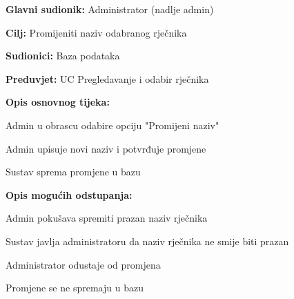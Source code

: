 \noindent {}
\begin{packed_item}

	\item \textbf{Glavni sudionik: } Administrator (nadlje admin)
	\item \textbf{Cilj: } Promijeniti naziv odabranog rječnika
	\item \textbf{Sudionici: } Baza podataka
	\item \textbf{Preduvjet: } UC Pregledavanje i odabir rječnika
	\item  \textbf{Opis osnovnog tijeka:}
	
	\item[] \begin{packed_enum}
		
		\item Admin u obrascu odabire opciju "Promijeni naziv"
		\item Admin upisuje novi naziv i potvrđuje promjene
		\item Sustav sprema promjene u bazu

	\end{packed_enum}

	\item  \textbf{Opis mogućih odstupanja:}
	
	\item[] \begin{packed_item}

		\item[2.a] Admin pokušava spremiti prazan naziv rječnika
		\item[] \begin{packed_enum}
			
			\item Sustav javlja administratoru da naziv rječnika ne smije biti prazan
			
		\end{packed_enum}

		\item[2.b] Administrator odustaje od promjena
		\item[] \begin{packed_enum}
			
			\item Promjene se ne spremaju u bazu
			
		\end{packed_enum}
		
	\end{packed_item}

\end{packed_item}

